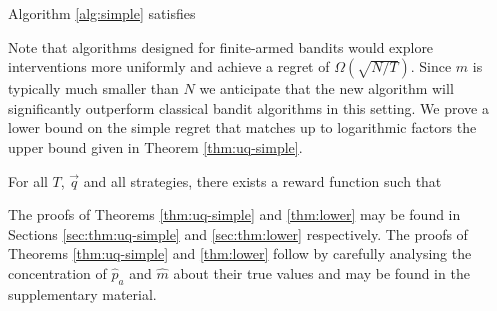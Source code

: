 \begin{theorem}\label{thm:uq-simple}
Algorithm \ref{alg:simple} satisfies
\end{theorem}

Note that algorithms designed for finite-armed bandits would explore interventions more uniformly and achieve a regret of $\Omega(\sqrt{N/T})$.
Since $m$ is typically much smaller than $N$ we anticipate that the new algorithm will significantly outperform classical bandit algorithms in
this setting.
We prove a lower bound on the simple regret that matches up to logarithmic factors the upper bound given in Theorem \ref{thm:uq-simple}.

\begin{theorem}\label{thm:lower}
For all $T$, $\vec{q}$ and all strategies, there exists a reward function such that
\end{theorem}

\ifsup
The proofs of Theorems \ref{thm:uq-simple} and \ref{thm:lower} may be found in Sections \ref{sec:thm:uq-simple} and \ref{sec:thm:lower} respectively.
\else
The proofs of Theorems \ref{thm:uq-simple} and \ref{thm:lower} follow by carefully analysing the concentration
of $\hat p_a$ and $\hat m$ about their true values and may be found in the supplementary material.
\fi



